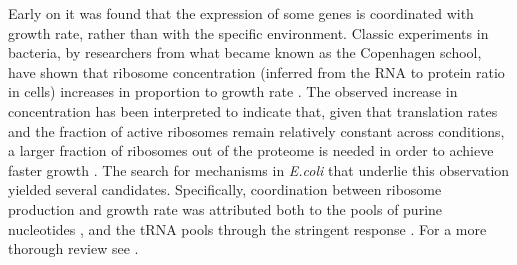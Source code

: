 Early on it was found that the expression of some genes is coordinated with growth rate, rather than with the specific environment.
Classic experiments in bacteria, by researchers from what became known as the Copenhagen school, have shown that ribosome concentration (inferred from the RNA to protein ratio in cells) increases in proportion to growth rate \cite{Schaechter1958}.
The observed increase in concentration has been interpreted to indicate that, given that translation rates and the fraction of active ribosomes remain relatively constant across conditions, a larger fraction of ribosomes out of the proteome is needed in order to achieve faster growth \cite{Neidhardt1999,Dennis2004,Zaslaver2009}. The search for mechanisms in \emph{E.coli} that underlie this observation yielded several candidates.
Specifically, coordination between ribosome production and growth rate was attributed both to the pools of purine nucleotides \cite{Gourse1996,Gaal1997}, and the tRNA pools through the stringent response \cite{Chatterji2001,Brauer2008a}.
For a more thorough review see \cite{Nomura1984}.